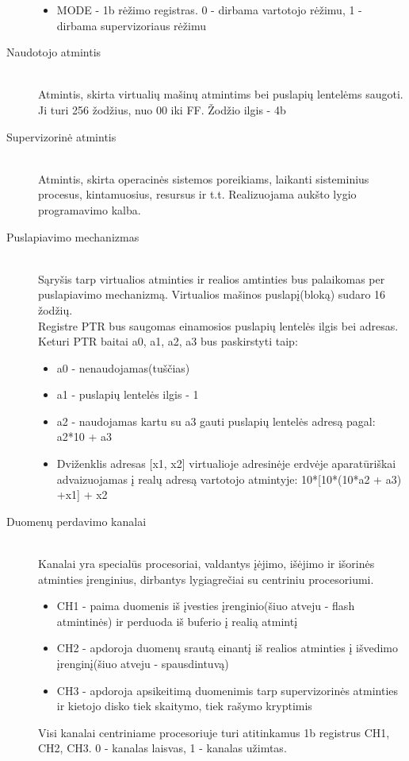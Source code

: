 \begin{description}
\begin{itemize}
  \item MODE - 1b rėžimo registras. 0 - dirbama vartotojo rėžimu, 1 - dirbama supervizoriaus rėžimu
\end{itemize}

  \item[Naudotojo atmintis] \leavevmode \\
Atmintis, skirta virtualių mašinų atmintims bei puslapių lentelėms saugoti. Ji turi 256 žodžius, nuo 00 iki FF. Žodžio ilgis - 4b
  \item[Supervizorinė atmintis] \leavevmode \\
Atmintis, skirta operacinės sistemos poreikiams, laikanti sisteminius procesus, kintamuosius, resursus ir t.t. Realizuojama aukšto lygio programavimo kalba.

\item[Puslapiavimo mechanizmas] \leavevmode \\
Sąryšis tarp virtualios atminties ir realios amtinties bus palaikomas per puslapiavimo mechanizmą. Virtualios mašinos puslapį(bloką) sudaro 16 žodžių.
\\ Registre PTR bus saugomas einamosios puslapių lentelės ilgis bei adresas. Keturi PTR baitai a0, a1, a2, a3 bus paskirstyti taip:
\begin{itemize}
\item a0 - nenaudojamas(tuščias)
\item a1 - puslapių lentelės ilgis - 1
\item a2 - naudojamas kartu su a3 gauti puslapių lentelės adresą pagal: a2*10 + a3
\item Dviženklis adresas [x1, x2]  virtualioje adresinėje erdvėje aparatūriškai advaizuojamas į realų adresą vartotojo atmintyje: 10*[10*(10*a2 + a3) +x1] + x2
\end{itemize}

  \item[Duomenų perdavimo kanalai] \leavevmode \\
Kanalai yra specialūs procesoriai, valdantys įėjimo, išėjimo ir išorinės atminties įrenginius, dirbantys lygiagrečiai su centriniu procesoriumi.
\begin{itemize}
  \item CH1 - paima duomenis iš įvesties įrenginio(šiuo atveju - flash atmintinės) ir perduoda iš buferio į realią atmintį
  \item CH2 - apdoroja duomenų srautą einantį iš realios atminties į išvedimo įrenginį(šiuo atveju - spausdintuvą)
  \item CH3 - apdoroja apsikeitimą duomenimis tarp supervizorinės atminties ir kietojo disko tiek skaitymo, tiek rašymo kryptimis
\end{itemize}
Visi kanalai centriniame procesoriuje turi atitinkamus 1b registrus CH1, CH2, CH3. 0 - kanalas laisvas, 1 - kanalas užimtas.



\end{description}

